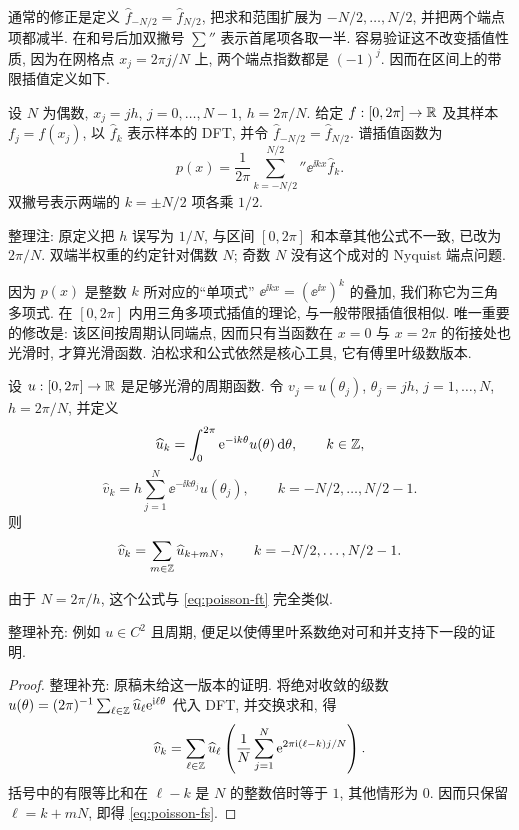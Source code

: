 通常的修正是定义 $\widehat f_{-N/2}=\widehat f_{N/2}$, 把求和范围扩展为 $-N/2,\ldots,N/2$, 并把两个端点项都减半. 在和号后加双撇号 $\sum''$ 表示首尾项各取一半. 容易验证这不改变插值性质, 因为在网格点 $x_j=2\pi j/N$ 上, 两个端点指数都是 $(-1)^j$. 因而在区间上的带限插值定义如下.

\begin{definition}[周期区间上的谱插值]\label{def:periodic-spectral-interpolation}
设 $N$ 为偶数, $x_j=jh$, $j=0,\ldots,N-1$, $h=2\pi/N$. 给定 $f:[0,2\pi]\to\mathbb R$ 及其样本 $f_j=f(x_j)$, 以 $\widehat f_k$ 表示样本的 DFT, 并令 $\widehat f_{-N/2}=\widehat f_{N/2}$. 谱插值函数为
\[
p(x)=\frac1{2\pi}\sum_{k=-N/2}^{N/2}{}''
\ee^{\ii kx}\widehat f_k.
\]
双撇号表示两端的 $k=\pm N/2$ 项各乘 $1/2$.
\end{definition}
\begin{remark}
整理注: 原定义把 $h$ 误写为 $1/N$, 与区间 $[0,2\pi]$ 和本章其他公式不一致, 已改为 $2\pi/N$. 双端半权重的约定针对偶数 $N$; 奇数 $N$ 没有这个成对的 Nyquist 端点问题.
\end{remark}

因为 $p(x)$ 是整数 $k$ 所对应的“单项式” $\ee^{\ii kx}=(\ee^{\ii x})^k$ 的叠加, 我们称它为三角多项式. 在 $[0,2\pi]$ 内用三角多项式插值的理论, 与一般带限插值很相似. 唯一重要的修改是: 该区间按周期认同端点, 因而只有当函数在 $x=0$ 与 $x=2\pi$ 的衔接处也光滑时, 才算光滑函数. 泊松求和公式依然是核心工具, 它有傅里叶级数版本.

\begin{theorem}\label{thm:poisson-fs}
设 $u:[0,2\pi]\to\mathbb R$ 是足够光滑的周期函数. 令 $v_j=u(\theta_j)$, $\theta_j=jh$, $j=1,\ldots,N$, $h=2\pi/N$, 并定义
\[
\widehat u_k=\int_0^{2\pi}\mathrm e^{-\mathrm i k\theta}u(\theta)\,\mathrm d\theta,
\qquad k\in\mathbb Z,
\]
\[
\widehat v_k=h\sum_{j=1}^{N}\ee^{-\ii k\theta_j}u(\theta_j),
\qquad k=-N/2,\ldots,N/2-1.
\]
则
\begin{equation}\label{eq:poisson-fs}
\widehat v_k=\sum_{m\in\mathbb Z}\widehat u_{k+mN},
\qquad k=-N/2,\ldots,N/2-1.
\end{equation}
\end{theorem}
由于 $N=2\pi/h$, 这个公式与 \eqref{eq:poisson-ft} 完全类似.
\begin{remark}
整理补充: 例如 $u\in C^2$ 且周期, 便足以使傅里叶系数绝对可和并支持下一段的证明.
\end{remark}
\begin{proof}
整理补充: 原稿未给这一版本的证明. 将绝对收敛的级数
$u(\theta)=(2\pi)^{-1}\sum_{\ell\in\mathbb Z}\widehat u_\ell\mathrm e^{\mathrm i\ell\theta}$
代入 DFT, 并交换求和, 得
\[
\widehat v_k=\sum_{\ell\in\mathbb Z}\widehat u_\ell
\left(\frac1N\sum_{j=1}^{N}\mathrm e^{2\pi\mathrm i(\ell-k)j/N}\right).
\]
括号中的有限等比和在 $\ell-k$ 是 $N$ 的整数倍时等于 $1$, 其他情形为 $0$. 因而只保留 $\ell=k+mN$, 即得 \eqref{eq:poisson-fs}.
\end{proof}

